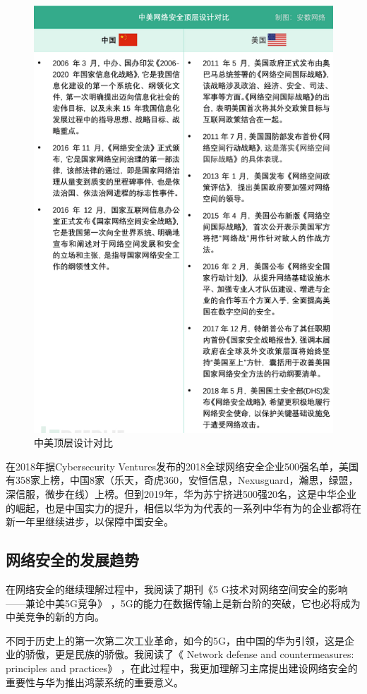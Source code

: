 \documentclass{article}
\begin{document}
\begin{figure}[h!]
	\centering
	\includegraphics[scale=0.55]{ChUSA}
	\caption{中美顶层设计对比}
	\label{fig:ChUSA}
\end{figure}
在2018年据Cybersecurity Ventures发布的2018全球网络安全企业500强名单，美国有358家上榜，中国8家（乐天，奇虎360，安恒信息，Nexusguard，瀚思，绿盟，深信服，微步在线）上榜。但到2019年，华为苏宁挤进500强20名，这是中华企业的崛起，也是中国实力的提升，相信以华为为代表的一系列中华有为的企业都将在新一年里继续进步，以保障中国安全。\par

\subsection{网络安全的发展趋势}
在网络安全的继续理解过程中，我阅读了期刊《5 G技术对网络空间安全的影响——兼论中美5G竞争》 \citep{20195G}，5G的能力在数据传输上是新台阶的突破，它也必将成为中美竞争的新的方向。\par
不同于历史上的第一次第二次工业革命，如今的5G，由中国的华为引领，这是企业的骄傲，更是民族的骄傲。我阅读了《 Network defense and countermeasures: principles and practices》 \citep{Easttom2005Network}，在此过程中，我更加理解习主席提出建设网络安全的重要性与华为推出鸿蒙系统的重要意义。
\end{document}
